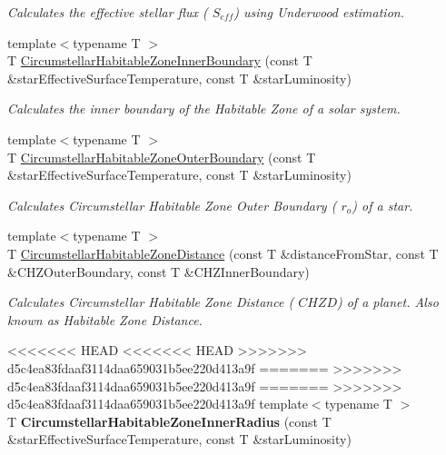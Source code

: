 \begin{DoxyCompactItemize}
\begin{DoxyCompactList}\small\item\em Calculates the effective stellar flux ( $S_{eff}$) using Underwood estimation. \end{DoxyCompactList}\item 
{\footnotesize template$<$typename T $>$ }\\T \hyperlink{group___astrophysics_ga9ee2e8023cb444aa4638c962788b5853}{Circumstellar\+Habitable\+Zone\+Inner\+Boundary} (const T \&star\+Effective\+Surface\+Temperature, const T \&star\+Luminosity)
\begin{DoxyCompactList}\small\item\em Calculates the inner boundary of the Habitable Zone of a solar system. \end{DoxyCompactList}\item 
{\footnotesize template$<$typename T $>$ }\\T \hyperlink{group___astrophysics_gaa47fcde814ba8007de800e930fc0a08d}{Circumstellar\+Habitable\+Zone\+Outer\+Boundary} (const T \&star\+Effective\+Surface\+Temperature, const T \&star\+Luminosity)
\begin{DoxyCompactList}\small\item\em Calculates Circumstellar Habitable Zone Outer Boundary ( $r_o$) of a star. \end{DoxyCompactList}\item 
{\footnotesize template$<$typename T $>$ }\\T \hyperlink{group___astrophysics_gacf3a720793cdb27f6d93b170b44e81be}{Circumstellar\+Habitable\+Zone\+Distance} (const T \&distance\+From\+Star, const T \&C\+H\+Z\+Outer\+Boundary, const T \&C\+H\+Z\+Inner\+Boundary)
\begin{DoxyCompactList}\small\item\em Calculates Circumstellar Habitable Zone Distance ( $CHZD$) of a planet. Also known as Habitable Zone Distance. \end{DoxyCompactList}\item 
<<<<<<< HEAD
<<<<<<< HEAD
>>>>>>> d5c4ea83fdaaf3114daa659031b5ee220d413a9f
=======
>>>>>>> d5c4ea83fdaaf3114daa659031b5ee220d413a9f
=======
>>>>>>> d5c4ea83fdaaf3114daa659031b5ee220d413a9f
\mbox{\label{namespace_e_g_x_phys_abcc7fdd3086efb4c0b786960a45c02e2}} 
{\footnotesize template$<$typename T $>$ }\\T {\bfseries Circumstellar\+Habitable\+Zone\+Inner\+Radius} (const T \&star\+Effective\+Surface\+Temperature, const T \&star\+Luminosity)

\end{DoxyCompactItemize}
